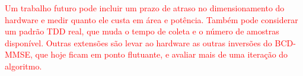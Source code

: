 \textcolor{red}{Um trabalho futuro pode incluir um prazo de atraso no dimensionamento do hardware e medir quanto ele custa em área e potência. Também pode considerar um padrão TDD real, que muda o tempo de coleta e o número de amostras disponível. Outras extensões são levar ao hardware as outras inversões do BCD-MMSE, que hoje ficam em ponto flutuante, e avaliar mais de uma iteração do algoritmo.}
